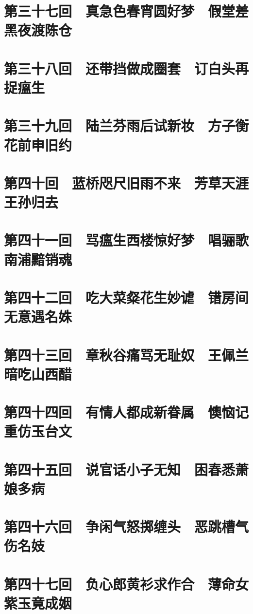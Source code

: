 \documentclass[12pt,UTF8]{ctexbook}
\begin{document}
\chapter{第三十七回　真急色春宵圆好梦　假堂差黑夜渡陈仓}

\chapter{第三十八回　还带挡做成圈套　订白头再捉瘟生}

\chapter{第三十九回　陆兰芬雨后试新妆　方子衡花前申旧约}

\chapter{第四十回　蓝桥咫尺旧雨不来　芳草天涯王孙归去}

\chapter{第四十一回　骂瘟生西楼惊好梦　唱骊歌南浦黯销魂}

\chapter{第四十二回　吃大菜粲花生妙谑　错房间无意遇名姝}

\chapter{第四十三回　章秋谷痛骂无耻奴　王佩兰暗吃山西醋}

\chapter{第四十四回　有情人都成新眷属　懊恼记重仿玉台文}

\chapter{第四十五回　说官话小子无知　困春悉萧娘多病}

\chapter{第四十六回　争闲气怒掷缠头　恶跳槽气伤名妓}

\chapter{第四十七回　负心郎黄衫求作合　薄命女紫玉竟成姻}
\end{document}
